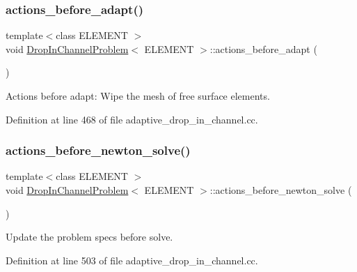 \subsubsection{\texorpdfstring{actions\+\_\+before\+\_\+adapt()}{actions\_before\_adapt()}}
{\footnotesize\ttfamily template$<$class E\+L\+E\+M\+E\+NT $>$ \\
void \hyperlink{classDropInChannelProblem}{Drop\+In\+Channel\+Problem}$<$ E\+L\+E\+M\+E\+NT $>$\+::actions\+\_\+before\+\_\+adapt (\begin{DoxyParamCaption}{ }\end{DoxyParamCaption})\hspace{0.3cm}{\ttfamily [inline]}}



Actions before adapt\+: Wipe the mesh of free surface elements. 



Definition at line 468 of file adaptive\+\_\+drop\+\_\+in\+\_\+channel.\+cc.

\mbox{\label{classDropInChannelProblem_a0e229343783fd73768dfa0a2672e9ad1}} 
\subsubsection{\texorpdfstring{actions\+\_\+before\+\_\+newton\+\_\+solve()}{actions\_before\_newton\_solve()}}
{\footnotesize\ttfamily template$<$class E\+L\+E\+M\+E\+NT $>$ \\
void \hyperlink{classDropInChannelProblem}{Drop\+In\+Channel\+Problem}$<$ E\+L\+E\+M\+E\+NT $>$\+::actions\+\_\+before\+\_\+newton\+\_\+solve (\begin{DoxyParamCaption}{ }\end{DoxyParamCaption})\hspace{0.3cm}{\ttfamily [inline]}}



Update the problem specs before solve. 



Definition at line 503 of file adaptive\+\_\+drop\+\_\+in\+\_\+channel.\+cc.

\mbox{\label{classDropInChannelProblem_a3a868202b34b195a78298b4eaf7d3aff}} 

